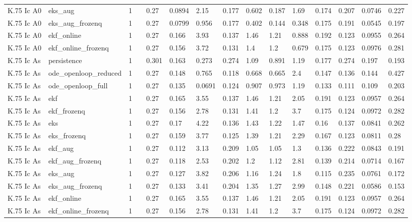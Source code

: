 \begin{table}[t]
\begin{tabular}{lllllllllllllll}
K.75 Ic A0 & eks\_aug & 1 &  & 0.27 & 0.0894 & 2.15 & 0.177 & 0.602 & 0.187 & 1.69 & 0.174 & 0.207 & 0.0746 & 0.227 \\
K.75 Ic A0 & eks\_aug\_frozenq & 1 &  & 0.27 & 0.0799 & 0.956 & 0.177 & 0.402 & 0.144 & 0.348 & 0.175 & 0.191 & 0.0545 & 0.197 \\
K.75 Ic A0 & ekf\_online & 1 &  & 0.27 & 0.166 & 3.93 & 0.137 & 1.46 & 1.21 & 0.888 & 0.192 & 0.123 & 0.0955 & 0.264 \\
K.75 Ic A0 & ekf\_online\_frozenq & 1 &  & 0.27 & 0.156 & 3.72 & 0.131 & 1.4 & 1.2 & 0.679 & 0.175 & 0.123 & 0.0976 & 0.281 \\
K.75 Ic As & persistence & 1 &  & 0.301 & 0.163 & 0.273 & 0.274 & 1.09 & 0.891 & 1.19 & 0.177 & 0.274 & 0.197 & 0.193 \\
K.75 Ic As & ode\_openloop\_reduced & 1 &  & 0.27 & 0.148 & 0.765 & 0.118 & 0.668 & 0.665 & 2.4 & 0.147 & 0.136 & 0.144 & 0.427 \\
K.75 Ic As & ode\_openloop\_full & 1 &  & 0.27 & 0.135 & 0.0691 & 0.124 & 0.907 & 0.973 & 1.19 & 0.133 & 0.111 & 0.109 & 0.203 \\
K.75 Ic As & ekf & 1 &  & 0.27 & 0.165 & 3.55 & 0.137 & 1.46 & 1.21 & 2.05 & 0.191 & 0.123 & 0.0957 & 0.264 \\
K.75 Ic As & ekf\_frozenq & 1 &  & 0.27 & 0.156 & 2.78 & 0.131 & 1.41 & 1.2 & 3.7 & 0.175 & 0.124 & 0.0972 & 0.282 \\
K.75 Ic As & eks & 1 &  & 0.27 & 0.17 & 4.22 & 0.136 & 1.43 & 1.22 & 1.47 & 0.16 & 0.137 & 0.0841 & 0.262 \\
K.75 Ic As & eks\_frozenq & 1 &  & 0.27 & 0.159 & 3.77 & 0.125 & 1.39 & 1.21 & 2.29 & 0.167 & 0.123 & 0.0811 & 0.28 \\
K.75 Ic As & ekf\_aug & 1 &  & 0.27 & 0.112 & 3.13 & 0.209 & 1.05 & 1.05 & 1.3 & 0.136 & 0.222 & 0.0843 & 0.191 \\
K.75 Ic As & ekf\_aug\_frozenq & 1 &  & 0.27 & 0.118 & 2.53 & 0.202 & 1.2 & 1.12 & 2.81 & 0.139 & 0.214 & 0.0714 & 0.167 \\
K.75 Ic As & eks\_aug & 1 &  & 0.27 & 0.127 & 3.82 & 0.206 & 1.16 & 1.24 & 1.8 & 0.115 & 0.235 & 0.0761 & 0.172 \\
K.75 Ic As & eks\_aug\_frozenq & 1 &  & 0.27 & 0.133 & 3.41 & 0.204 & 1.35 & 1.27 & 2.99 & 0.148 & 0.221 & 0.0586 & 0.153 \\
K.75 Ic As & ekf\_online & 1 &  & 0.27 & 0.165 & 3.55 & 0.137 & 1.46 & 1.21 & 2.05 & 0.191 & 0.123 & 0.0957 & 0.264 \\
K.75 Ic As & ekf\_online\_frozenq & 1 &  & 0.27 & 0.156 & 2.78 & 0.131 & 1.41 & 1.2 & 3.7 & 0.175 & 0.124 & 0.0972 & 0.282 \\

\end{tabular}
\end{table}
